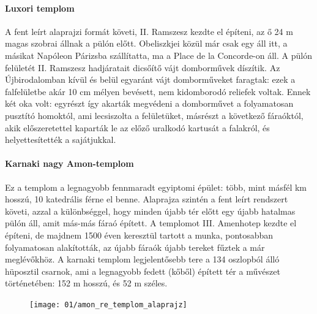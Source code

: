 \paragraph{Luxori templom}
A fent leírt alaprajzi formát követi, II. Ramszesz kezdte el építeni, az ő 24 m magas szobrai állnak a pülón előtt. Obeliszkjei közül már csak egy áll itt, a másikat Napóleon Párizsba szállítatta, ma a Place de la Concorde-on áll. A pülón felületét II. Ramszesz hadjáratait dicsőítő vájt domborművek díszítik. Az Újbirodalomban kívül és belül egyaránt vájt domborműveket faragtak: ezek a falfelületbe akár 10 cm mélyen bevésett, nem kidomborodó reliefek voltak. Ennek két oka volt: egyrészt így akarták megvédeni a domborművet a folyamatosan pusztító homoktól, ami lecsiszolta a felületüket, másrészt a következő fáraóktól, akik előszeretettel kaparták le az előző uralkodó kartusát a falakról, és helyettesítették a sajátjukkal.

\paragraph{Karnaki nagy Amon-templom}
Ez a templom a legnagyobb fennmaradt egyiptomi épület: több, mint másfél km hosszú, 10 katedrális férne el benne. Alaprajza szintén a fent leírt rendszert követi, azzal a különbséggel, hogy minden újabb tér előtt egy újabb hatalmas pülón áll, amit más-más fáraó épített. A templomot III. Amenhotep kezdte el építeni, de majdnem 1500 éven keresztül tartott a munka, pontosabban folyamatosan alakították, az újabb fáraók újabb tereket fűztek a már meglévőkhöz. A karnaki templom legjelentősebb tere a 134 oszlopból álló hüposztil csarnok, ami a legnagyobb fedett (kőből) épített tér a művészet történetében: 152 m hosszú, és 52 m széles.

\begin{figure}[H]
	\centering
	\begin{tcolorbox}[enhanced,colframe=gray!50!white,
		colbacktitle=white!15!white,
		coltitle=gray!50!black,
		borderline={0.5mm}{0mm}{gray!15!white},
		borderline={0.5mm}{0mm}{gray!50!white,dashed},
		attach boxed title to top center={yshift=-2mm},
		boxed title style={boxrule=0.4pt},
		title=Az Amon-Ré templomkörzet]{
			\texttt{[image: 01/amon\_re\_templom\_alaprajz]}}
		
	\end{tcolorbox}
\end{figure}

